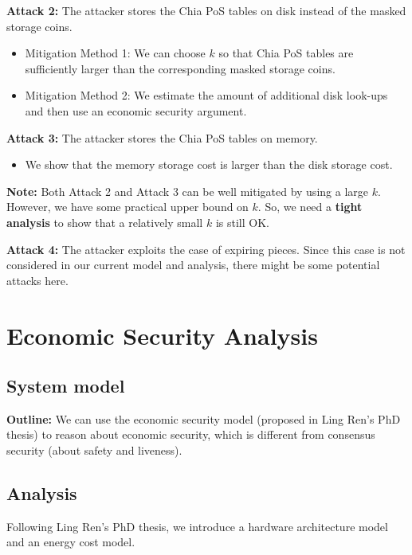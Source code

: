 \documentclass[12pt,draftcls,onecolumn]{IEEEtran}
\begin{document}
{\bf Attack 2:} The attacker stores the Chia PoS tables on disk instead of the masked storage coins.

\begin{itemize}
    \item Mitigation Method 1: We can choose $k$ so that Chia PoS tables are sufficiently larger than the corresponding masked storage coins.
    \item Mitigation Method 2: We estimate the amount of additional disk look-ups and then use an economic security argument.
\end{itemize}

{\bf Attack 3:} The attacker stores the Chia PoS tables on memory.

\begin{itemize}
    \item We show that the memory storage cost is larger than the disk storage cost.
\end{itemize}

{\bf Note:} Both Attack 2 and Attack 3 can be well mitigated by using a large $k$. However, we have some practical upper bound on $k$. So, we need a {\bf tight analysis} to show that a relatively small $k$ is still OK.

{\bf Attack 4:} The attacker exploits the case of expiring pieces. Since this case is not considered in our current model and analysis, there might be some potential attacks here.



\section{Economic Security Analysis}

\subsection{System model}

{\bf Outline:} We can use the economic security model (proposed in Ling Ren's PhD thesis) to reason about economic security, which is different from consensus security (about safety and liveness).

\subsection{Analysis}

Following Ling Ren's PhD thesis, we introduce a hardware architecture model and an energy cost model.
\end{document}
